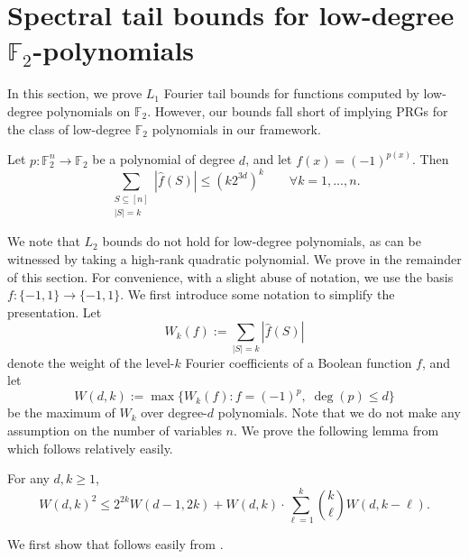 \documentclass{toc}
\newcommand{\F}{\mathbb{F}}
\begin{document}
\section{Spectral tail bounds for low-degree \texorpdfstring{$\F_2$}{F2}-polynomials}
\label{section:lowdegree_spectral}
In this section, we prove  $L_1$ Fourier tail bounds for functions computed by low-degree polynomials on $\F_2$. However, our bounds fall short of implying PRGs for the class of low-degree $\F_2$ polynomials in our framework.
\begin{theorem}
\label{thm:polynomialspectralnorm} Let $p:\F_2^n \to \F_2$ be a polynomial
of degree $d$, and let $f(x)=(-1)^{p(x)}$. Then
$$
\sum_{\substack{S\subseteq [n] \\ |S| = k }} |\widehat{f}(S)| \leq   (k2^{3d})^k \qquad \forall k=1,\ldots,n.
$$
\end{theorem}
We note that $L_2$ bounds do not hold for low-degree polynomials, as can be witnessed by taking a high-rank quadratic polynomial. We prove  in the remainder of this section.
For convenience, with a slight abuse of notation, we use the basis $f:\{-1,1\}\rightarrow \{-1,1\}$.
We first introduce some notation to simplify the presentation. Let
$$
W_k(f) := \sum_{|S|=k} |\hat{f}(S)|
$$
denote the weight of the level-$k$ Fourier coefficients of a Boolean
function $f$, and let
$$
W(d,k) := \max \{W_k(f): f=(-1)^p, \; \deg(p) \le d\}
$$
be the maximum of $W_k$ over degree-$d$ polynomials. Note that we do not make any assumption on the number of variables $n$. We prove the following lemma from which  follows relatively easily.
\begin{lemma}
\label{lemma:rec_poly} For any $d,k \ge 1$, $$ W(d,k)^{2} \le 2^{2k}W(d-1,2k) + W(d,k) \cdot \sum_{\ell=1}^{k} \binom{k}{\ell}   W(d, k -\ell).$$
\end{lemma}

We first show that  follows easily from .
\end{document}
